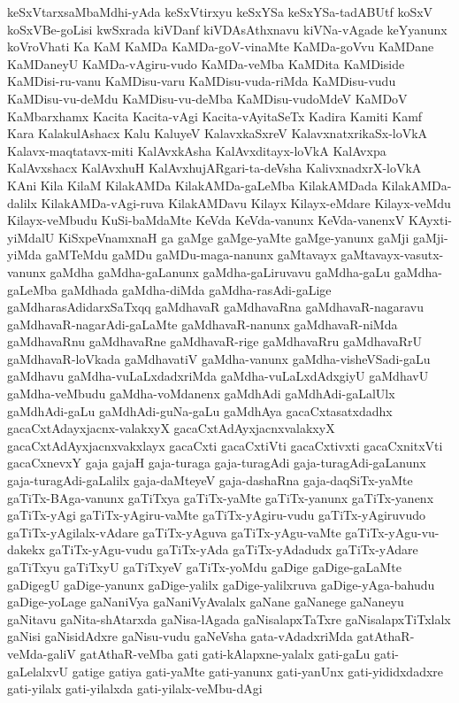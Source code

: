 {keSxVtarxsaMbaMdhi-yAda
keSxVtirxyu
keSxYSa
keSxYSa-tadABUtf
koSxV
koSxVBe-goLisi
kwSxrada
kiVDanf
kiVDAsAthxnavu
kiVNa-vAgade
keYyanunx
koVroVhati
Ka
KaM
KaMDa
KaMDa-goV-vinaMte
KaMDa-goVvu
KaMDane
KaMDaneyU
KaMDa-vAgiru-vudo
KaMDa-veMba
KaMDita
KaMDiside
KaMDisi-ru-vanu
KaMDisu-varu
KaMDisu-vuda-riMda
KaMDisu-vudu
KaMDisu-vu-deMdu
KaMDisu-vu-deMba
KaMDisu-vudoMdeV
KaMDoV
KaMbarxhamx
Kacita
Kacita-vAgi
Kacita-vAyitaSeTx
Kadira
Kamiti
Kamf
Kara
KalakulAshacx
Kalu
KaluyeV
KalavxkaSxreV
KalavxnatxrikaSx-loVkA
Kalavx-maqtatavx-miti
KalAvxkAsha
KalAvxditayx-loVkA
KalAvxpa
KalAvxshacx
KalAvxhuH
KalAvxhujARgari-ta-deVsha
KalivxnadxrX-loVkA
KAni
Kila
KilaM
KilakAMDa
KilakAMDa-gaLeMba
KilakAMDada
KilakAMDa-dalilx
KilakAMDa-vAgi-ruva
KilakAMDavu
Kilayx
Kilayx-eMdare
Kilayx-veMdu
Kilayx-veMbudu
KuSi-baMdaMte
KeVda
KeVda-vanunx
KeVda-vanenxV
KAyxti-yiMdalU
KiSxpeVnamxnaH
ga
gaMge
gaMge-yaMte
gaMge-yanunx
gaMji
gaMji-yiMda
gaMTeMdu
gaMDu
gaMDu-maga-nanunx
gaMtavayx
gaMtavayx-vasutx-vanunx
gaMdha
gaMdha-gaLanunx
gaMdha-gaLiruvavu
gaMdha-gaLu
gaMdha-gaLeMba
gaMdhada
gaMdha-diMda
gaMdha-rasAdi-gaLige
gaMdharasAdidarxSaTxqq
gaMdhavaR
gaMdhavaRna
gaMdhavaR-nagaravu
gaMdhavaR-nagarAdi-gaLaMte
gaMdhavaR-nanunx
gaMdhavaR-niMda
gaMdhavaRnu
gaMdhavaRne
gaMdhavaR-rige
gaMdhavaRru
gaMdhavaRrU
gaMdhavaR-loVkada
gaMdhavatiV
gaMdha-vanunx
gaMdha-visheVSadi-gaLu
gaMdhavu
gaMdha-vuLaLxdadxriMda
gaMdha-vuLaLxdAdxgiyU
gaMdhavU
gaMdha-veMbudu
gaMdha-voMdanenx
gaMdhAdi
gaMdhAdi-gaLalUlx
gaMdhAdi-gaLu
gaMdhAdi-guNa-gaLu
gaMdhAya
gacaCxtasatxdadhx
gacaCxtAdayxjacnx-valakxyX
gacaCxtAdAyxjacnxvalakxyX
gacaCxtAdAyxjacnxvakxlayx
gacaCxti
gacaCxtiVti
gacaCxtivxti
gacaCxnitxVti
gacaCxnevxY
gaja
gajaH
gaja-turaga
gaja-turagAdi
gaja-turagAdi-gaLanunx
gaja-turagAdi-gaLalilx
gaja-daMteyeV
gaja-dashaRna
gaja-daqSiTx-yaMte
gaTiTx-BAga-vanunx
gaTiTxya
gaTiTx-yaMte
gaTiTx-yanunx
gaTiTx-yanenx
gaTiTx-yAgi
gaTiTx-yAgiru-vaMte
gaTiTx-yAgiru-vudu
gaTiTx-yAgiruvudo
gaTiTx-yAgilalx-vAdare
gaTiTx-yAguva
gaTiTx-yAgu-vaMte
gaTiTx-yAgu-vu-dakekx
gaTiTx-yAgu-vudu
gaTiTx-yAda
gaTiTx-yAdadudx
gaTiTx-yAdare
gaTiTxyu
gaTiTxyU
gaTiTxyeV
gaTiTx-yoMdu
gaDige
gaDige-gaLaMte
gaDigegU
gaDige-yanunx
gaDige-yalilx
gaDige-yalilxruva
gaDige-yAga-bahudu
gaDige-yoLage
gaNaniVya
gaNaniVyAvalalx
gaNane
gaNanege
gaNaneyu
gaNitavu
gaNita-shAtarxda
gaNisa-lAgada
gaNisalapxTaTxre
gaNisalapxTiTxlalx
gaNisi
gaNisidAdxre
gaNisu-vudu
gaNeVsha
gata-vAdadxriMda
gatAthaR-veMda-galiV
gatAthaR-veMba
gati
gati-kAlapxne-yalalx
gati-gaLu
gati-gaLelalxvU
gatige
gatiya
gati-yaMte
gati-yanunx
gati-yanUnx
gati-yididxdadxre
gati-yilalx
gati-yilalxda
gati-yilalx-veMbu-dAgi
}
